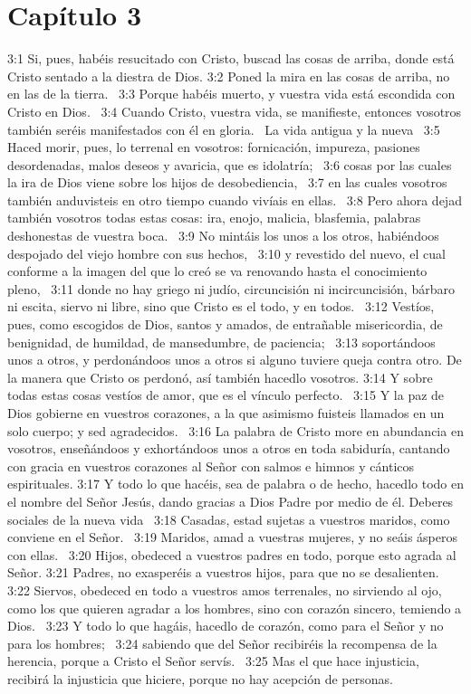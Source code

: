\section*{Capítulo 3}

3:1 Si, pues, habéis resucitado con Cristo, buscad las cosas de arriba, donde está Cristo sentado a la diestra de Dios. 
3:2 Poned la mira en las cosas de arriba, no en las de la tierra.  
3:3 Porque habéis muerto, y vuestra vida está escondida con Cristo en Dios.  
3:4 Cuando Cristo, vuestra vida, se manifieste, entonces vosotros también seréis manifestados con él en gloria.  
La vida antigua y la nueva  
3:5 Haced morir, pues, lo terrenal en vosotros: fornicación, impureza, pasiones desordenadas, malos deseos y avaricia, que es idolatría;  
3:6 cosas por las cuales la ira de Dios viene sobre los hijos de desobediencia,  
3:7 en las cuales vosotros también anduvisteis en otro tiempo cuando vivíais en ellas.  
3:8 Pero ahora dejad también vosotros todas estas cosas: ira, enojo, malicia, blasfemia, palabras deshonestas de vuestra boca.  
3:9 No mintáis los unos a los otros, habiéndoos despojado del viejo hombre con sus hechos,  
3:10 y revestido del nuevo, el cual conforme a la imagen del que lo creó se va renovando hasta el conocimiento pleno,  
3:11 donde no hay griego ni judío, circuncisión ni incircuncisión, bárbaro ni escita, siervo ni libre, sino que Cristo es el todo, y en todos.  
3:12 Vestíos, pues, como escogidos de Dios, santos y amados, de entrañable misericordia, de benignidad, de humildad, de mansedumbre, de paciencia;  
3:13 soportándoos unos a otros, y perdonándoos unos a otros si alguno tuviere queja contra otro. De la manera que Cristo os perdonó, así también hacedlo vosotros. 
3:14 Y sobre todas estas cosas vestíos de amor, que es el vínculo perfecto.  
3:15 Y la paz de Dios gobierne en vuestros corazones, a la que asimismo fuisteis llamados en un solo cuerpo; y sed agradecidos.  
3:16 La palabra de Cristo more en abundancia en vosotros, enseñándoos y exhortándoos unos a otros en toda sabiduría, cantando con gracia en vuestros corazones al Señor con salmos e himnos y cánticos espirituales. 
3:17 Y todo lo que hacéis, sea de palabra o de hecho, hacedlo todo en el nombre del Señor Jesús, dando gracias a Dios Padre por medio de él. 
Deberes sociales de la nueva vida  
3:18 Casadas, estad sujetas a vuestros maridos, como conviene en el Señor.  
3:19 Maridos, amad a vuestras mujeres, y no seáis ásperos con ellas.  
3:20 Hijos, obedeced a vuestros padres en todo, porque esto agrada al Señor. 
3:21 Padres, no exasperéis a vuestros hijos, para que no se desalienten.  
3:22 Siervos, obedeced en todo a vuestros amos terrenales, no sirviendo al ojo, como los que quieren agradar a los hombres, sino con corazón sincero, temiendo a Dios.  
3:23 Y todo lo que hagáis, hacedlo de corazón, como para el Señor y no para los hombres;  
3:24 sabiendo que del Señor recibiréis la recompensa de la herencia, porque a Cristo el Señor servís.  
3:25 Mas el que hace injusticia, recibirá la injusticia que hiciere, porque no hay acepción de personas. 
